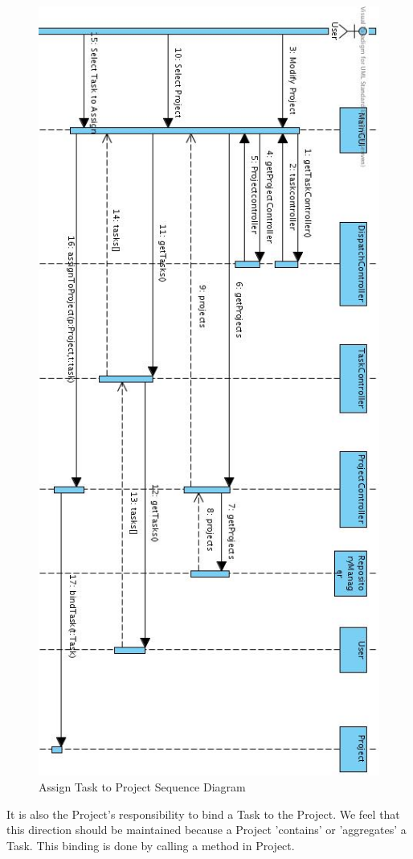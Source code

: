 			\begin{figure}[H]
				\begin{center}
					\includegraphics[scale=0.5]{images/assign_task_to_project.jpg}
				\end{center}
				\caption{Assign Task to Project Sequence Diagram}
			\end{figure}
			It is also the Project's responsibility to bind a Task to the Project. We feel that this direction should be maintained because a Project 'contains' or 'aggregates' a Task. This binding is done by calling a method in Project.
	
